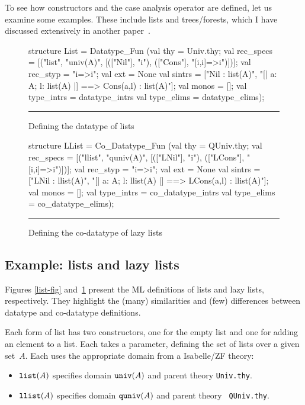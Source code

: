 To see how constructors and the case analysis operator are defined, let us
examine some examples.  These include lists and trees/forests, which I have
discussed extensively in another paper~\cite{paulson-set-II}.

\begin{figure}
\begin{ttbox} 
structure List = Datatype_Fun
 (val thy = Univ.thy;
  val rec_specs = 
      [("list", "univ(A)",
          [(["Nil"],    "i"), 
           (["Cons"],   "[i,i]=>i")])];
  val rec_styp = "i=>i";
  val ext = None
  val sintrs = 
      ["Nil : list(A)",
       "[| a: A;  l: list(A) |] ==> Cons(a,l) : list(A)"];
  val monos = [];
  val type_intrs = datatype_intrs
  val type_elims = datatype_elims);
\end{ttbox}
\hrule
\caption{Defining the datatype of lists} \label{list-fig}

\medskip
\begin{ttbox}
structure LList = Co_Datatype_Fun
 (val thy = QUniv.thy;
  val rec_specs = 
      [("llist", "quniv(A)",
          [(["LNil"],   "i"), 
           (["LCons"],  "[i,i]=>i")])];
  val rec_styp = "i=>i";
  val ext = None
  val sintrs = 
      ["LNil : llist(A)",
       "[| a: A;  l: llist(A) |] ==> LCons(a,l) : llist(A)"];
  val monos = [];
  val type_intrs = co_datatype_intrs
  val type_elims = co_datatype_elims);
\end{ttbox}
\hrule
\caption{Defining the co-datatype of lazy lists} \label{llist-fig}
\end{figure}

\subsection{Example: lists and lazy lists}
Figures \ref{list-fig} and~\ref{llist-fig} present the ML definitions of
lists and lazy lists, respectively.  They highlight the (many) similarities
and (few) differences between datatype and co-datatype definitions.

Each form of list has two constructors, one for the empty list and one for
adding an element to a list.  Each takes a parameter, defining the set of
lists over a given set~$A$.  Each uses the appropriate domain from a
Isabelle/ZF theory:
\begin{itemize}
\item ${\tt list}(A)$ specifies domain ${\tt univ}(A)$ and parent theory {\tt Univ.thy}.

\item ${\tt llist}(A)$ specifies domain ${\tt quniv}(A)$ and parent theory {\tt
QUniv.thy}.
\end{itemize}

